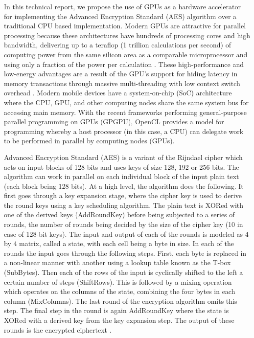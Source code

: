 \documentclass[conference,10pt]{IEEEtran}
\begin{document}
In this technical report, we propose the use of GPUs as a hardware accelerator for implementing the 
Advanced Encryption Standard (AES) algorithm over a traditional CPU based implementation.  Modern GPUs are 
attractive for parallel processing because these architectures have hundreds of processing cores and high 
bandwidth, delivering up to a teraflop (1 trillion calculations per second) of computing power from the 
same silicon area as a comparable microprocessor and using only a fraction of the power per calculation 
\cite{myth}. These high-performance and low-energy advantages are a result of the GPU's support for hiding 
latency in memory transactions through massive multi-threading with low context switch overhead 
\cite{aes_gpu}.  Modern mobile devices have a system-on-chip (SoC) architecture where the CPU, GPU, and 
other computing nodes share the same system bus for accessing main memory. With the recent frameworks 
performing general-purpose parallel programming on GPUs (GPGPU), OpenCL provides a model for programming 
whereby a host processor (in this case, a CPU) can delegate work to be performed in parallel by computing 
nodes (GPUs).

Advanced Encryption Standard (AES) is a variant of the Rijndael cipher which acts on input blocks of 128 
bits and uses keys of size 128, 192 or 256 bits. The algorithm can work in parallel on each individual 
block of the input plain text (each block being 128 bits). At a high level, the algorithm does the 
following. It first goes through a key expansion stage, where the cipher key is used to derive the round 
keys using a key scheduling algorithm. The plain text is XORed with one of the derived keys (AddRoundKey) 
before being subjected to a series of rounds, the number of rounds being decided by the size of the cipher 
key (10 in case of 128-bit keys). The input and output of each of the rounds is modeled as 4 by 4 matrix, 
called a state, with each cell being a byte in size. In each of the rounds the input goes through the 
following steps. First, each byte is replaced in a non-linear manner with another using a lookup table 
known as the T-box (SubBytes). Then each of the rows of the input is cyclically shifted to the left a 
certain number of steps (ShiftRows). This is followed by a mixing operation which operates on the columns 
of the state, combining the four bytes in each column (MixColumns). The last round of the encryption 
algorithm omits this step. The final step in the round is again AddRoundKey where the state is XORed with a 
derived key from the key expansion step. The output of these rounds is the encrypted ciphertext 
\cite{aes1,aes2}.
\end{document}
